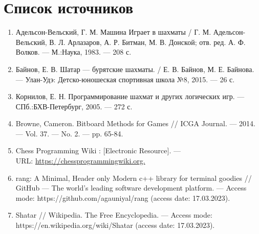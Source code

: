 {
	\chapter*{Список источников}
	\begin{enumerate}
		\item Адельсон-Вельский, Г. М. Машина Играет в шахматы / Г. М. Адельсон-Вельский, В. Л. Арлазаров, А. Р. Битман, М. В. Донской; отв. ред. А. Ф. Волков. --- М.:Наука, 1983. --- 208 с.
		\item Байнов, Е. В. Шатар --- бурятские шахматы. / Е. В. Байнов, М. Е. Байнова. --- Улан-Удэ: Детско-юношеская спортивная школа №8, 2015. --- 26 с.
		\item Корнилов, Е. Н. Программирование шахмат и других логических игр. --- СПб.:БХВ-Петербург, 2005. --- 272 с. 
		\item Browne, Cameron. Bitboard Methods for Games // ICGA Journal. --- 2014. --- Vol. 37. --- No. 2. --- pp. 65-84.
		\item Chess Programming Wiki : [Electronic Resource]. --- \\URL: \href{https://chessprogrammingwiki.org}{https://chessprogrammingwiki.org.}
		\item rang: A Minimal, Header only Modern c++ library for terminal goodies // GitHub --- The world’s leading software development platform. --- Access mode: https://github.com/agauniyal/rang
		(access date: 17.03.2023).
		\item Shatar // Wikipedia. The Free Encyclopedia. --- Access mode: \\ https://en.wikipedia.org/wiki/Shatar
		(access date: 17.03.2023).
	\end{enumerate}
	\clearpage
}